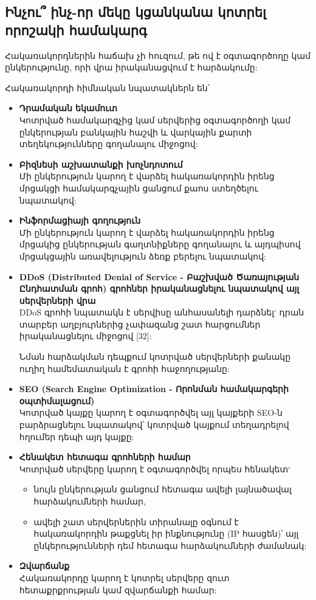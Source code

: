\documentclass[a4paper,12pt]{article}
\begin{document}
\begin{sloppypar}
\subsection{Ինչու՞ ինչ-որ մեկը կցանկանա կոտրել որոշակի համակարգ}


Հակառակորդներին հաճախ չի հուզում, թե ով է օգտագործողը կամ ընկերությունը,
որի վրա իրականացվում է հարձակումը:

Հակառակորդի հիմնական նպատակներն են՝

\begin{itemize}
\item \textbf{Դրամական եկամուտ} \\
	Կոտրված համակարգչից կամ սերվերից օգտագործողի
    կամ ընկերության բանկային հաշվի և վարկային քարտի տեղեկությունները
    գողանալու միջոցով:
\item \textbf{Բիզնեսի աշխատանքի խոչնդոտում} \\
	Մի ընկերություն կարող է վարձել
    հակառակորդին իրենց մրցակցի համակարգչային ցանցում քաոս ստեղծելու
    նպատակով:
\item \textbf{Ինֆորմացիայի գողություն} \\
	Մի ընկերություն կարող է վարձել
    հակառակորդին իրենց մրցակից ընկերության գաղտնիքները գողանալու և
    այդպիսով մրցակցային առավելություն ձեռք բերելու նպատակով:
\item \textbf{DDoS (Distributed Denial of Service - Բաշխված Ծառայության Ընդհատման գրոհ) գրոհներ
    իրականացնելու նպատակով այլ սերվերների վրա} \\
	DDoS գրոհի նպատակն է սերվիսը անհասանելի դարձնել`
	դրան տարբեր աղբյուրներից չափազանց շատ հարցումներ
	իրականացնելու միջոցով [32]:
	
    Նման հարձակման դեպքում կոտրված սերվերների քանակը
	ուղիղ համեմատական է գրոհի հաջողությանը:
\item \textbf{SEO (Search Engine Optimization - Որոնման համակարգերի օպտիմալացում)} \\
	Կոտրված կայքը կարող է
    օգտագործվել այլ կայքերի SEO-ն բարձրացնելու նպատակով՝ կոտրված կայքում
    տեղադրելով հղումեր դեպի այդ կայքը:
\item \textbf{Հենակետ հետագա գրոհների համար} \\
	Կոտրված սերվերը կարող է օգտագործվել
	որպես հենակետ`
	\begin{itemize}
	\item նույն ընկերության ցանցում հետագա ավելի լայնածավալ հարձակումների
		համար,
	\item ավելի շատ սերվերներին տիրանալը օգնում է հակառակորդին թաքցնել
		իր ինքնությունը (IP հասցեն)՝ այլ ընկերությունների դեմ հետագա
		հարձակումների ժամանակ:
	\end{itemize}
\item \textbf{Զվարճանք} \\
	Հակառակորդը կարող է կոտրել սերվերը զուտ հետաքրքրության կամ
    զվարճանքի համար:
\end{itemize}



\end{sloppypar}
\end{document}
